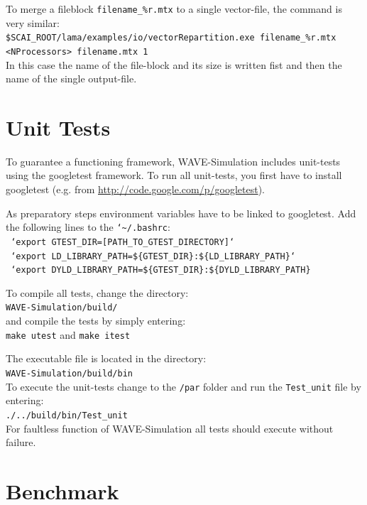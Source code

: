 \documentclass[pdftex,a4paper,parskip,listof=totoc,bibliography=totoc,onehalfspacing,12pt]{scrreprt}
\newcommand{\shellcmd}[1]{\indent\indent\texttt{#1}}	%
\newcommand{\shellcmdline}[1]{\indent\indent\texttt{\quad#1}} 	%
\begin{document}
To merge a fileblock \shellcmd{filename\_\%r.mtx} to a single vector-file, the command is very similar:\\
\shellcmdline{\$SCAI\_ROOT/lama/examples/io/vectorRepartition.exe filename\_\%r.mtx}\\
\shellcmdline{<NProcessors> filename.mtx 1}\\
In this case the name of the file-block and its size is written fist and then the name of the single output-file.

\section{Unit Tests}
To guarantee a functioning framework, WAVE-Simulation includes unit-tests using the googletest framework. To run all unit-tests, you first have to install googletest (e.g. from \url{http://code.google.com/p/googletest}). 

As preparatory steps environment variables have to be linked to googletest. Add the following lines to the \shellcmd{{\char`\~}/.bashrc}:
\\\shellcmdline{ `export GTEST\_DIR=[PATH\_TO\_GTEST\_DIRECTORY]`}
\\\shellcmdline{ `export LD\_LIBRARY\_PATH=\$\{GTEST\_DIR\}:\$\{LD\_LIBRARY\_PATH\}`}
\\\shellcmdline{ `export DYLD\_LIBRARY\_PATH=\$\{GTEST\_DIR\}:\$\{DYLD\_LIBRARY\_PATH\}}

To compile all tests, change the directory: \\\shellcmdline{WAVE-Simulation/build/} \\ and compile the tests by simply entering:\\\shellcmdline{make utest} and \shellcmdline{make itest}

The executable file is located in the directory:
\\\shellcmdline{WAVE-Simulation/build/bin}\\
To execute the unit-tests change to the \shellcmd{/par} folder and run the \shellcmd{Test\_unit} file by entering:
\\\shellcmdline{./../build/bin/Test\_unit}\\ 
For faultless function of WAVE-Simulation all tests should execute without failure.

\section{Benchmark}
\end{document}
